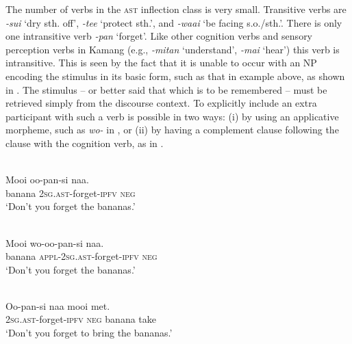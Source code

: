 



The number of verbs in the \textsc{ast} inflection class is very small. Transitive verbs are \textit{-sui} `dry sth. off', \textit{-tee} `protect sth.', and \textit{-waai} `be facing s.o./sth.'. There is only one intransitive verb \textit{-pan} `forget'. Like other cognition verbs and sensory perception verbs in Kamang (e.g., \textit{-mitan} `understand', \textit{-mai} `hear') this verb is intransitive. This is seen by the fact that it is unable to occur with an NP encoding the stimulus in its basic form, such as that in example  above, as shown in . The stimulus -- or better said that which is to be remembered -- must be retrieved simply from the discourse context. To explicitly include an extra participant with such a verb is possible in two ways: (i) by using an applicative morpheme, such as \textit{wo-} in , or (ii) by having a complement clause following the clause with the cognition verb, as in . 


\ea%
\label{bkm:Ref372879210}
 \\ 
\gll *Mooi  oo-pan-si  naa.\\  
      banana  \textsc{2sg.ast}{}-forget-\textsc{ipfv} \textsc{neg}  \\
\glt  `Don't you forget the bananas.'
\z



 



\ea%
\label{bkm:Ref372879221}
 \\ 
\gll    Mooi  wo-oo-pan-si  naa.\\  
  banana  \textsc{appl-2sg.ast}{}-forget-\textsc{ipfv} \textsc{neg}  \\
\glt `Don't you forget the bananas.'
\z



  

  

\ea%
\label{bkm:Ref372879227}
 \\ 
\gll  Oo-pan-si  naa  mooi  met. \\  
    \textsc{2sg.ast}{}-forget-\textsc{ipfv} \textsc{neg}  banana  take \\
\glt  `Don't you forget to bring the bananas.'
\z

